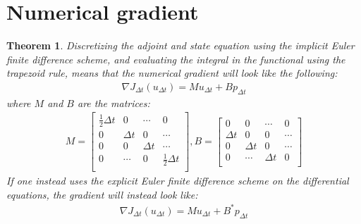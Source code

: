 \documentclass[11pt,a4paper]{article}
\newtheorem{theorem}{Theorem}
\begin{document}
\section{Numerical gradient}
\begin{theorem}
Discretizing the adjoint and state equation using the implicit Euler finite difference scheme, and evaluating the integral in the functional using the trapezoid rule, means that the numerical gradient will look like the following:
\begin{align}
\nabla J_{\Delta t}(u_{\Delta t}) = Mu_{\Delta t} + Bp_{\Delta t} \label{num_grad}
\end{align}
where $M$ and $B$ are the matrices:
\begin{align*}
M=\left[ \begin{array}{cccc}
   \frac{1}{2}\Delta t & 0 & \cdots & 0 \\  
   0& \Delta t & 0 & \cdots \\ 
   0 &0 & \Delta t  & \cdots \\
   0 &\cdots &0 & \frac{1}{2}\Delta t   \\
   \end{array}  \right] 
,B = \left[ \begin{array}{cccc}
   0& 0 & \cdots & 0 \\  
   \Delta t& 0 & 0 & \cdots \\ 
   0 & \Delta t& 0  & \cdots \\
   0 &\cdots & \Delta t& 0   \\
   \end{array}  \right] 
\end{align*}
If one instead uses the explicit Euler finite difference scheme on the differential equations, the gradient will instead look like:
\begin{align*}
\nabla J_{\Delta t}(u_{\Delta t}) = Mu_{\Delta t} + B^*p_{\Delta t}
\end{align*}
\end{theorem}
\end{document}
